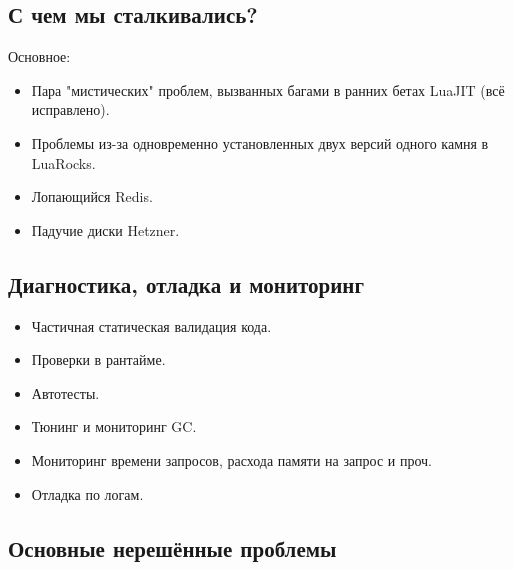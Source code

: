 \documentclass[aspectratio=169,handout,bigger]{beamer}
\begin{document}

\subsection*{С чем мы сталкивались?}

\begin{frame}
  Основное:

  \begin{itemize}
    \item Пара "мистических" проблем, вызванных багами в ранних бетах LuaJIT (всё исправлено).
    \item Проблемы из-за одновременно установленных двух версий одного камня в LuaRocks.
    \item Лопающийся Redis.
    \item Падучие диски Hetzner.
  \end{itemize}
\end{frame}


\subsection*{Диагностика, отладка и мониторинг}

\begin{frame}
  \begin{itemize}
    \item Частичная статическая валидация кода.
    \item Проверки в рантайме.
    \item Автотесты.
    \item Тюнинг и мониторинг GC.
    \item Мониторинг времени запросов, расхода памяти на запрос и проч.
    \item Отладка по логам.
  \end{itemize}
\end{frame}



\subsection*{Основные нерешённые проблемы}
\end{document}

